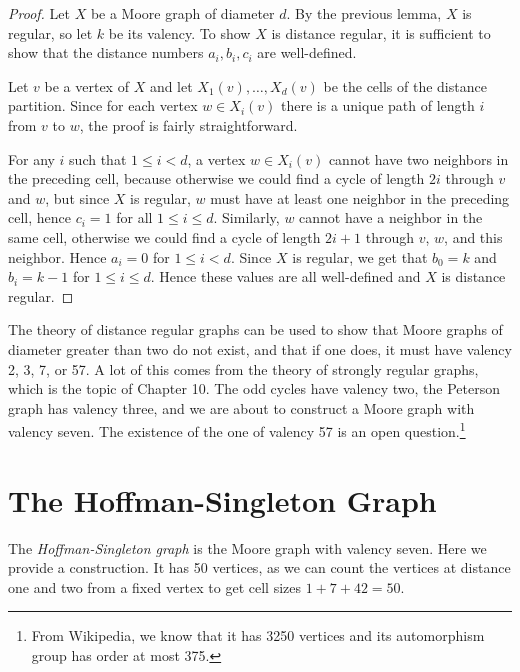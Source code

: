 \begin{proof}
	Let $X$ be a Moore graph of diameter $d$.  By the previous lemma, $X$ is regular, so let $k$ be its valency.  To show $X$ is distance regular, it is sufficient to show that the distance numbers $a_i,b_i,c_i$ are well-defined.
	
	Let $v$ be a vertex of $X$ and let $X_1(v),\dots, X_d(v)$ be the cells of the distance partition.  Since for each vertex $w\in X_i(v)$ there is a unique path of length $i$ from $v$ to $w$, the proof is fairly straightforward.
	
	For any $i$ such that $1\leq i < d$, a vertex $w\in X_i(v)$ cannot have two neighbors in the preceding cell, because otherwise we could find a cycle of length $2i$ through $v$ and $w$, but since $X$ is regular, $w$ must have at least one neighbor in the preceding cell, hence $c_i=1$ for all $1\leq i \leq d$.  Similarly, $w$ cannot have a neighbor in the same cell, otherwise we could find a cycle of length $2i+1$ through $v$, $w$, and this neighbor.  Hence $a_i=0$ for $1\leq i < d$.  Since $X$ is regular, we get that $b_0=k$ and $b_i=k-1$ for $1\leq i \leq d$.  Hence these values are all well-defined and $X$ is distance regular.
\end{proof}

The theory of distance regular graphs can be used to show that Moore graphs of diameter greater than two do not exist, and that if one does, it must have valency 2, 3, 7, or 57.  A lot of this comes from the theory of strongly regular graphs, which is the topic of Chapter 10.  The odd cycles have valency two, the Peterson graph has valency three, and we are about to construct a Moore graph with valency seven.  The existence of the one of valency 57 is an open question.\footnote{From Wikipedia, we know that it has 3250 vertices and its automorphism group has order at most 375.}

\section*{The Hoffman-Singleton Graph}
The \textit{Hoffman-Singleton graph} is the Moore graph with valency seven.  Here we provide a construction.  It has 50 vertices, as we can count the vertices at distance one and two from a fixed vertex to get cell sizes $1+7+42=50$.

